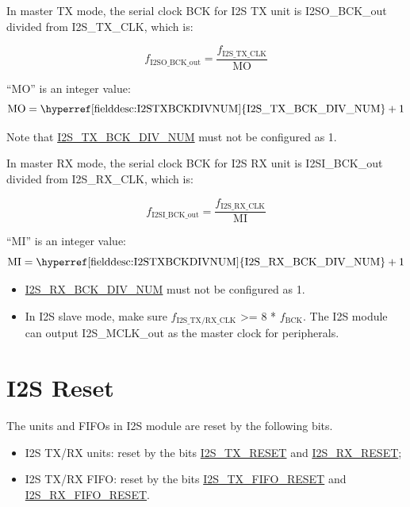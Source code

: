 \documentclass[main\_\_EN.tex]{subfiles}
\begin{document}
In master TX mode, the serial clock BCK for I2S TX unit is I2SO\_BCK\_out divided from I2S\_TX\_CLK, which is:

$$f_{\textrm{I2SO\_BCK\_out}} = \frac{f_{\textrm{I2S\_TX\_CLK}}}{\textrm{MO}}$$


``MO” is an integer value:
$$ \textrm{MO} = \textrm{\hyperref[fielddesc:I2STXBCKDIVNUM]{I2S\_TX\_BCK\_DIV\_NUM}} + 1 $$

\vspace{-1em}
\begin{tiplisting}
Note that \hyperref[fielddesc:I2STXBCKDIVNUM]{I2S\_TX\_BCK\_DIV\_NUM} must not be configured as 1.
\end{tiplisting}

In master RX mode, the serial clock BCK for I2S RX unit is I2SI\_BCK\_out divided from I2S\_RX\_CLK, which is:

$$f_{\textrm{I2SI\_BCK\_out}} = \frac{f_{\textrm{I2S\_RX\_CLK}}}{\textrm{MI}}$$

``MI” is an integer value:
$$ \textrm{MI} = \textrm{\hyperref[fielddesc:I2STXBCKDIVNUM]{I2S\_RX\_BCK\_DIV\_NUM}} + 1 $$

\clearpage

\begin{tiplisting}
\vspace{-2em}
\begin{itemize}
    \item \hyperref[fielddesc:I2SRXBCKDIVNUM]{I2S\_RX\_BCK\_DIV\_NUM} must not be configured as 1.
    \item In I2S slave mode, make sure $f_{\textrm{I2S\_TX/RX\_CLK}}$ >= 8 * $f_{\textrm{BCK}}$. The I2S module can output I2S\_MCLK\_out as the master clock for peripherals.
\end{itemize}
\end{tiplisting}

\section{I2S Reset} \label{sec:i2s-reset}

The units and FIFOs in I2S module are reset by the following bits.
\begin{itemize}
\item I2S TX/RX units: reset by the bits  \hyperref[fielddesc:I2STXRESET]{I2S\_TX\_RESET} and  \hyperref[fielddesc:I2SRXRESET]{I2S\_RX\_RESET};
\item I2S TX/RX FIFO: reset by the bits  \hyperref[fielddesc:I2STXFIFORESET]{I2S\_TX\_FIFO\_RESET} and  \hyperref[fielddesc:I2SRXFIFORESET]{I2S\_RX\_FIFO\_RESET}.
\end{itemize}
\end{document}

